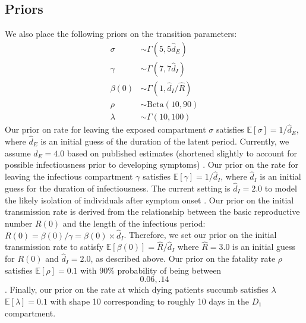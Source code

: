 \documentclass[11pt]{amsart}
\newcommand{\Beta}{\text{Beta}}
\newcommand{\E}{\mathbb{E}}
\begin{document}
  \subsection{Priors}
We also place the following priors on the transition parameters: 
\begin{align*}
\sigma &\sim \Gamma(5, 5 \hat{d}_E)\\
\gamma & \sim \Gamma(7, 7 \hat{d}_I) \\
\beta(0) &\sim \Gamma(1, \hat{d}_I/\hat{R}) \\
    \rho &\sim \Beta(10, 90)\\ 
\lambda &\sim \Gamma(10, 100)
\end{align*}
 Our prior on rate for leaving the exposed compartment $\sigma$ satisfies $\E[\sigma] = 1/\hat{d}_E$, where $\hat{d}_E$ is an initial guess of the duration of the latent period. Currently, we assume $\hat{d}_E = 4.0$ based on published estimates (shortened slightly to account for possible infectiousness prior to developing symptoms) \cite{midas}.
 Our prior on the rate for leaving the infectious compartment $\gamma$ satisfies $\E[\gamma] = 1/\hat{d}_I$, where $\hat{d}_I$ is an initial guess for the duration of infectiousness. The current setting is $\hat{d}_I = 2.0$ to model the likely isolation of individuals after symptom onset \cite{heffner2020emotional}. 
Our prior on the initial transmission rate is derived from the relationship between the basic reproductive number $R(0)$ and the length of the infectious period: $R(0) = \beta(0)/\gamma = \beta(0)\times \hat{d}_I$. Therefore, we set our prior on the initial transmission rate to satisfy $\E[\beta(0)] = \hat{R}/\hat{d}_I$ where $\hat{R} = 3.0$ is an initial guess for $R(0)$ and $\hat{d}_I = 2.0$, as described above. 
Our prior on the fatality rate $\rho$ satisfies $\E[\rho] = 0.1$ with 90\% probability of being between \[0.06,.14\].
Finally, our prior on the rate at which dying patients succumb  satisfies $\lambda$ $\E[\lambda] = 0.1$ with shape 10 corresponding to roughly 10 days in the $D_{1}$ compartment.
\end{document}
